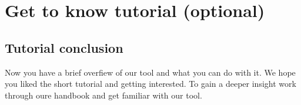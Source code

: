 \section{Get to know tutorial (optional)}
\genHeader






\subsection{Tutorial conclusion}
Now you have a brief overfiew of our tool and what you can do with it. We hope you liked the short tutorial and getting interested. To gain a deeper insight work through oure handbook and get familiar with our tool.
